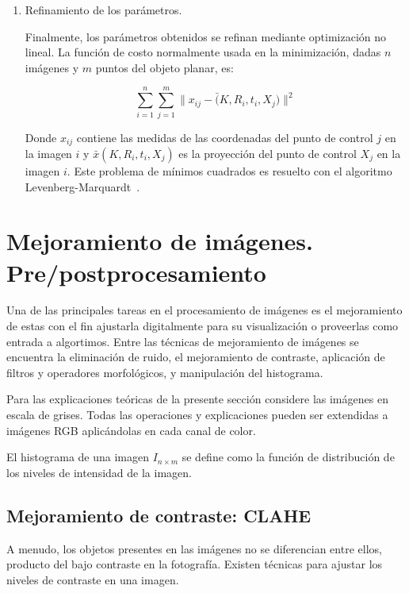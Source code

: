\begin{enumerate}
	\item Refinamiento de los parámetros.
	
	Finalmente, los parámetros obtenidos se refinan mediante optimización no lineal. La función de costo normalmente usada en la minimización, dadas $n$ imágenes y $m$ puntos del objeto planar, es:
	
	\begin{equation}
		\sum_{i=1}^n\sum_{j=1}^m \|x_{ij} - \bar(K, R_i, t_i, X_j)\|^2
	\end{equation}

	Donde $x_{ij}$ contiene las medidas de las coordenadas del punto de control $j$ en la imagen $i$ y $\bar{x}(K, R_i, t_i, X_j)$ es la proyección del punto de control $X_j$ en la imagen $i$. Este problema de mínimos cuadrados es resuelto con el algoritmo Levenberg-Marquardt~\cite{more1978levenberg}.
\end{enumerate}

\section{Mejoramiento de imágenes. Pre/postprocesamiento}\label{section:imgEnh}

Una de las principales tareas en el procesamiento de imágenes es el mejoramiento de estas con el fin ajustarla digitalmente para su visualización o proveerlas como entrada a algortimos. Entre las técnicas de mejoramiento de imágenes se encuentra la eliminación de ruido, el mejoramiento de contraste, aplicación de filtros y operadores morfológicos, y manipulación del histograma.

Para las explicaciones teóricas de la presente sección considere las imágenes en escala de grises. Todas las operaciones y explicaciones pueden ser extendidas a imágenes RGB aplicándolas en cada canal de color.

\begin{definition}
	El histograma de una imagen $I_{n \times m}$ se define como la función de distribución de los niveles de intensidad de la imagen.
\end{definition}

\subsection{Mejoramiento de contraste: CLAHE}

A menudo, los objetos presentes en las imágenes no se diferencian entre ellos, producto del bajo contraste en la fotografía. Existen técnicas para ajustar los niveles de contraste en una imagen.

